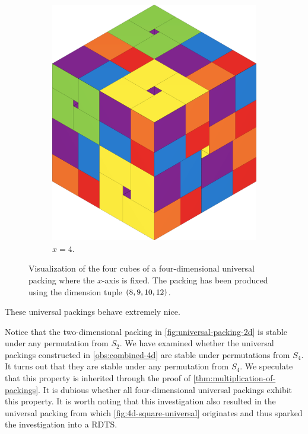 \begin{figure}[ht]
\begin{subfigure}[b]{0.47\textwidth}
        \includegraphics[scale=0.18]{graphics/4d-universal-cube-4.png}
        \caption*{$x = 4$.}
    \end{subfigure}
    \caption{Visualization of the four cubes of a four-dimensional universal packing where the $x$-axis is fixed. The packing has been produced using the dimension tuple $\left( 8, 9, 10, 12 \right)$.}
    \label{fig:4d-universal-packing}
\end{figure}

\noindent These universal packings behave extremely nice.

\begin{observation}
Notice that the two-dimensional packing in \cref{fig:universal-packing-2d} is stable under any permutation from $S_2$. We have examined whether the universal packings constructed in \cref{obs:combined-4d} are stable under permutations from $S_4$. It turns out that they are stable under any permutation from $S_4$. We speculate that this property is inherited through the proof of \cref{thm:multiplication-of-packings}. It is dubious whether all four-dimensional universal packings exhibit this property. It is worth noting that this investigation also resulted in the universal packing from which \cref{fig:4d-square-universal} originates and thus sparked the investigation into a RDTS.
\end{observation}

